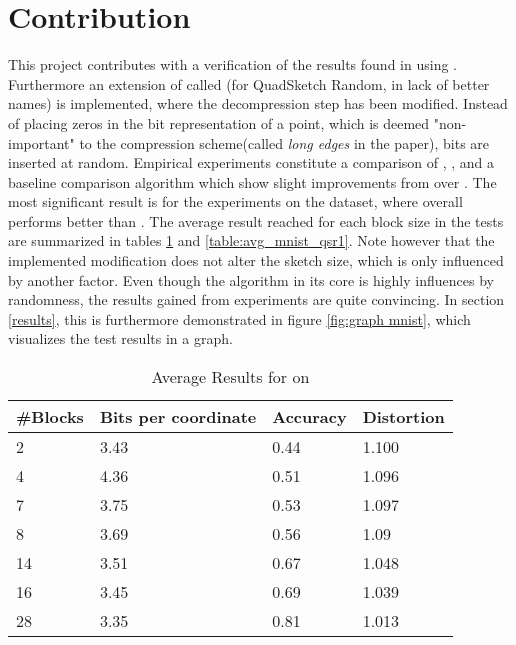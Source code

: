 \section{Contribution}
\label{contribution}
This project contributes with a verification of the results found in \cite{wagner17} using \qs{}. Furthermore an extension of \qs{} called \qsr{} (for QuadSketch Random, in lack of better names) is implemented, where the decompression step has been modified. Instead of placing zeros in the bit representation of a point, which is deemed "non-important" to the compression scheme(called \textit{long edges} in the paper), bits are inserted at random. Empirical experiments constitute a comparison of \qs{}, \qsr{}, and a baseline comparison algorithm \grid{} which show slight improvements from \qsr{} over \qs{}. The most significant result is for the experiments on the \mnist{} dataset, where \qsr{} overall performs better than \qs{}. The average result reached for each block size in the tests are summarized in tables \ref{table:avg_mnist_qs1} and \ref{table:avg_mnist_qsr1}. Note however that the implemented modification does not alter the sketch size, which is only influenced by another factor. Even though the algorithm in its core is highly influences by randomness, the results gained from experiments are quite convincing. In section \ref{results}, this is furthermore demonstrated in figure \ref{fig:graph mnist}, which visualizes the test results in a graph.


\begin{table}[h]
	\centering
	\caption{Average Results for \qs{} on \mnist{}}
	\label{table:avg_mnist_qs1}
	\begin{tabular}{l l l l}
		\hline
		\#Blocks & Bits per coordinate & Accuracy  & Distortion \\ \hline
		2 & 3.43 & 0.44 & 1.100  \\
		4 & 4.36 & 0.51 & 1.096  \\
		7 & 3.75 & 0.53 & 1.097 \\
		8 & 3.69 & 0.56 & 1.09 \\
		14 & 3.51 & 0.67 & 1.048 \\
		16 & 3.45 & 0.69 & 1.039 \\
		28 & 3.35 & 0.81 & 1.013 \\
		\hline
	\end{tabular}
\end{table}

